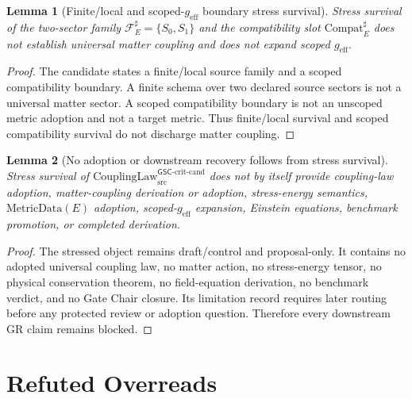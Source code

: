 \documentclass[11pt]{article}
\newcommand{\geff}{g_{\mathrm{eff}}}
\newcommand{\CouplingLawCrit}{\mathrm{CouplingLaw}^{\mathsf{GSC}\mbox{-}\mathrm{crit}\mbox{-}\mathrm{cand}}_{\mathrm{src}}}
\newcommand{\MetricData}{\mathrm{MetricData}}
\newcommand{\Compat}{\mathrm{Compat}}
\newcommand{\Fsrc}{\mathcal{F}_{E}^{\sharp}}
\newtheorem{lemma}{Lemma}
\begin{document}
\begin{lemma}[Finite/local and scoped-\(\geff\) boundary stress survival]
Stress survival of the two-sector family \(\Fsrc=\{S_0,S_1\}\) and the
compatibility slot \(\Compat_E^{\sharp}\) does not establish universal matter
coupling and does not expand scoped \(\geff\).
\end{lemma}

\begin{proof}
The candidate states a finite/local source family and a scoped compatibility
boundary. A finite schema over two declared source sectors is not a universal
matter sector. A scoped compatibility boundary is not an unscoped metric
adoption and not a target metric. Thus finite/local survival and scoped
compatibility survival do not discharge matter coupling.
\end{proof}

\begin{lemma}[No adoption or downstream recovery follows from stress survival]
Stress survival of \(\CouplingLawCrit\) does not by itself provide
coupling-law adoption, matter-coupling derivation or adoption, stress-energy
semantics, \(\MetricData(E)\) adoption, scoped-\(\geff\) expansion, Einstein
equations, benchmark promotion, or completed derivation.
\end{lemma}

\begin{proof}
The stressed object remains draft/control and proposal-only. It contains no
adopted universal coupling law, no matter action, no stress-energy tensor, no
physical conservation theorem, no field-equation derivation, no benchmark
verdict, and no Gate Chair closure. Its limitation record requires later
routing before any protected review or adoption question. Therefore every
downstream GR claim remains blocked.
\end{proof}

\section{Refuted Overreads}
\end{document}
